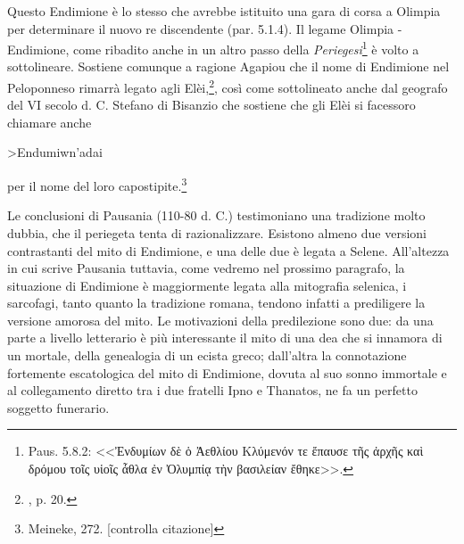 \documentclass[12pt,a4paper,openright, oneside]{book}
\begin{document}
Questo Endimione è lo stesso che avrebbe istituito una gara di corsa a Olimpia per determinare il nuovo re discendente (par. 5.1.4). Il legame Olimpia - Endimione, come ribadito anche in un altro passo della \textit{Periegesi}\footnote{Paus. 5.8.2: <<Ἐνδυμίων δὲ ὁ Ἀεθλίου Κλύμενόν τε ἔπαυσε τῆς ἀρχῆς καὶ δρόμου τοῖς υἱοῖς ἆθλα ἐν Ὀλυμπίᾳ τὴν βασιλείαν ἔθηκε>>.} è volto a sottolineare. 
Sostiene comunque a ragione Agapiou che il nome di Endimione nel Peloponneso rimarrà legato agli Elèi,\footnote{\cite{Agapiou}, p. 20.}, così come sottolineato anche dal geografo del VI secolo d. C. Stefano di Bisanzio che sostiene che gli Elèi si facessoro chiamare anche \begin{otherlanguage}{greek} >Endumiwn'adai \end{otherlanguage} per il nome del loro capostipite.\footnote{Meineke, 272. [controlla citazione]}

Le conclusioni di Pausania (110-80 d. C.) testimoniano una tradizione molto dubbia, che il periegeta tenta di razionalizzare. Esistono almeno due versioni contrastanti del mito di Endimione, e una delle due è legata a Selene. All'altezza in cui scrive Pausania tuttavia, come vedremo nel prossimo paragrafo, la situazione di Endimione è maggiormente legata alla mitografia selenica, i sarcofagi, tanto quanto la tradizione romana, tendono infatti a prediligere la versione amorosa del mito. Le motivazioni della predilezione sono due: da una parte a livello letterario è più interessante il mito di una dea che si innamora di un mortale, della genealogia di un ecista greco; dall'altra la connotazione fortemente escatologica del mito di Endimione, dovuta al suo sonno immortale e al collegamento diretto tra i due fratelli Ipno e Thanatos, ne fa un perfetto soggetto funerario.
 
\end{document}
